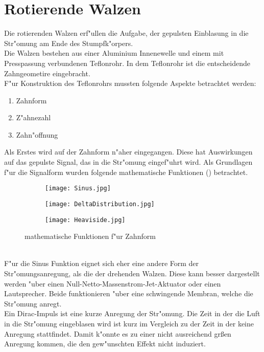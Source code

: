\section{Rotierende Walzen}
\label{rotierendeWalze}
Die rotierenden Walzen erf"ullen die Aufgabe, der gepulsten Einblasung in die Str"omung am Ende des Stumpfk"orpers.\\
Die Walzen bestehen aus einer Aluminium Innenewelle und einem mit Presspassung verbundenen Teflonrohr. In dem Teflonrohr ist die entscheidende Zahngeometire eingebracht.\\
F"ur Konstruktion des Teflonrohrs mussten folgende Aspekte betrachtet werden:
\begin{enumerate}
	\item Zahnform 
	\item Z"ahnezahl
	\item Zahn"offnung 
\end{enumerate}
Als Erstes wird auf der Zahnform n"aher eingegangen. Diese hat Auswirkungen auf das gepulste Signal, das in die Str"omung eingef"uhrt wird. Als Grundlagen f"ur die Signalform wurden folgende mathematische Funktionen () betrachtet.\\
\begin{figure}[h]
	\centering
	\begin{subfigure}[c]{0.5\textwidth}		
		\texttt{[image: Sinus.jpg]}
	\end{subfigure}
	\begin{subfigure}[c]{0.5\textwidth}
		\texttt{[image: DeltaDistribution.jpg]}
	\end{subfigure}
	\begin{subfigure}[c]{0.5\textwidth}
		\texttt{[image: Heaviside.jpg]}
	\end{subfigure}
	\caption{mathematische Funktionen f"ur Zahnform}
	\label{fig:function}
\end{figure}\\
F"ur die Sinus Funktion eignet sich eher eine andere Form der Str"omungsanregung, als die der drehenden Walzen. Diese kann besser dargestellt werden "uber einen Null-Netto-Massenstrom-Jet-Aktuator \cite{Utturkar.2003} oder einen Lautsprecher. Beide funktionieren "uber eine schwingende Membran, welche die Str"omung anregt.\\
Ein Dirac-Impuls ist eine kurze Anregung der Str"omung. Die Zeit in der die Luft in die Str"omung eingeblasen wird ist kurz im Vergleich zu der Zeit in der keine Anregung stattfindet. Damit k"onnte es zu einer nicht ausreichend gr\ss{}en Anregung kommen, die den gew"unschten Effekt nicht induziert.\\
